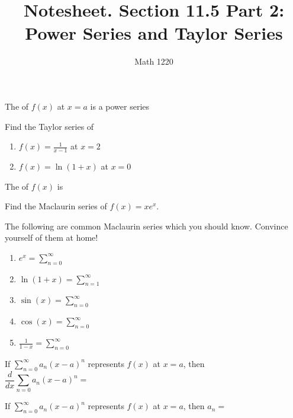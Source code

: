 \documentclass[12pt, a4paper]{article}
\author{Math 1220}
\title{Notesheet. Section 11.5 Part 2: Power Series and Taylor Series}
\date{}
\begin{document}
\maketitle
\nameline
\begin{defn}
  The  of \(f(x)\) at \(x=a\) is a power series 
\end{defn}
\vspace{0.25in}
\begin{ex}
  Find the Taylor series of
  \begin{enumerate}
  \item \(f(x) = \frac{1}{x-1}\) at \(x=2\)
    \vspace{2in}
  \item \(f(x) = \ln(1+x)\) at \(x=0\)
  \end{enumerate}
\end{ex}
\begin{defn}
  The  of \(f(x)\) is 
\end{defn}
\vspace{0.25in}
\pagebreak
\begin{ex}
  Find the Maclaurin series of \(f(x) = xe^x\).
\end{ex}
\begin{ex}
  The following are common Maclaurin series which you should
  know. Convince yourself of them at home!
  \begin{enumerate}
  \item \(e^x = \sum_{n=0}^\infty\)
  \item \(\ln(1+x) = \sum_{n=1}^\infty\)
  \item \(\sin(x) = \sum_{n=0}^\infty\)
  \item \(\cos(x) = \sum_{n=0}^\infty\)
  \item \(\frac{1}{1-x} = \sum_{n=0}^\infty\)
  \end{enumerate}
\end{ex}
\vspace{-2in}
\begin{thrm}
  If \(\sum_{n=0}^\infty a_n(x-a)^n\) represents \(f(x)\) at \(x=a\),
  then \[
    \frac{d}{dx} \sum_{n=0} a_n(x-a)^n = \hspace{5in}
  \]
\end{thrm}
\begin{thrm}
  If \(\sum_{n=0}^\infty a_n (x-a)^n\) represents \(f(x)\) at \(x=a\),
  then \(a_n = \)
\end{thrm}
\end{document}
